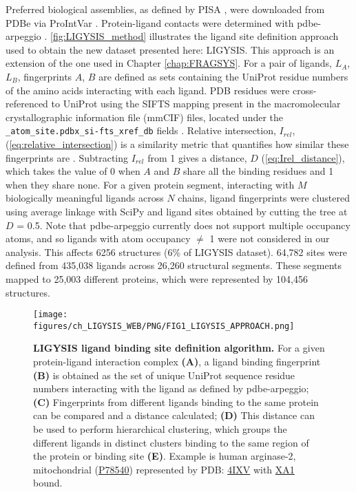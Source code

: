 Preferred biological assemblies, as defined by PISA \cite{KRISSINEL_2007_PISA}, were downloaded from PDBe via ProIntVar \cite{MACGOWAN_2020_DRSASP}. Protein-ligand contacts were determined with pdbe-arpeggio \cite{JUBB_2017_ARPEGGIO}. \autoref{fig:LIGYSIS_method} illustrates the ligand site definition approach used to obtain the new dataset presented here: LIGYSIS. This approach is an extension of the one used in Chapter \ref{chap:FRAGSYS}. For a pair of ligands, $L_A$, $L_B$, fingerprints $A$, $B$ are defined as sets containing the UniProt residue numbers of the amino acids interacting with each ligand. PDB residues were cross-referenced to UniProt using the SIFTS mapping present in the macromolecular crystallographic information file (mmCIF) files, located under the \texttt{\_atom\_site.pdbx\_si-fts\_xref\_db} fields \cite{VELANKAR_2012_SIFTS, DANA_2018_SIFTS}. Relative intersection, $I_{rel}$, (\autoref{eq:relative_intersection}) is a similarity metric that quantifies how similar these fingerprints are \cite{UTGES_2024_FRAGSYS}. Subtracting $I_{rel}$ from 1 gives a distance, $D$ (\autoref{eq:Irel_distance}), which takes the value of 0 when $A$ and $B$ share all the binding residues and 1 when they share none. For a given protein segment, interacting with $M$ biologically meaningful ligands across $N$ chains, ligand fingerprints were clustered using average linkage with SciPy \cite{VIRTANEN_2020_SCIPY} and ligand sites obtained by cutting the tree at $D$ = 0.5. Note that pdbe-arpeggio currently does not support multiple occupancy atoms, and so ligands with atom occupancy $\neq$ 1 were not considered in our analysis. This affects 6256 structures (6\% of LIGYSIS dataset). 64,782 sites were defined from 435,038 ligands across 26,260 structural segments. These segments mapped to 25,003 different proteins, which were represented by 104,456 structures.

\begin{figure}[htb!]
    \centering
    \texttt{[image: figures/ch\_LIGYSIS\_WEB/PNG/FIG1\_LIGYSIS\_APPROACH.png]}
    \caption[LIGYSIS ligand binding site definition algorithm]{\textbf{LIGYSIS ligand binding site definition algorithm.} For a given protein-ligand interaction complex \textbf{(A)}, a ligand binding fingerprint \textbf{(B)} is obtained as the set of unique UniProt sequence residue numbers interacting with the ligand as defined by pdbe-arpeggio; \textbf{(C)} Fingerprints from different ligands binding to the same protein can be compared and a distance calculated; \textbf{(D)} This distance can be used to perform hierarchical clustering, which groups the different ligands in distinct clusters binding to the same region of the protein or binding site \textbf{(E)}. Example is human arginase-2, mitochondrial (\href{https://www.uniprot.org/uniprotkb/P78540/entry}{P78540}) represented by PDB: \href{https://www.ebi.ac.uk/pdbe/entry/pdb/4ixv}{4IXV} \cite{GOLEBIOWSKI_2013_ARGINASE} with \href{https://www.ebi.ac.uk/pdbe-srv/pdbechem/chemicalCompound/show/XA1}{XA1} bound.}
    \label{fig:LIGYSIS_method}
\end{figure}

